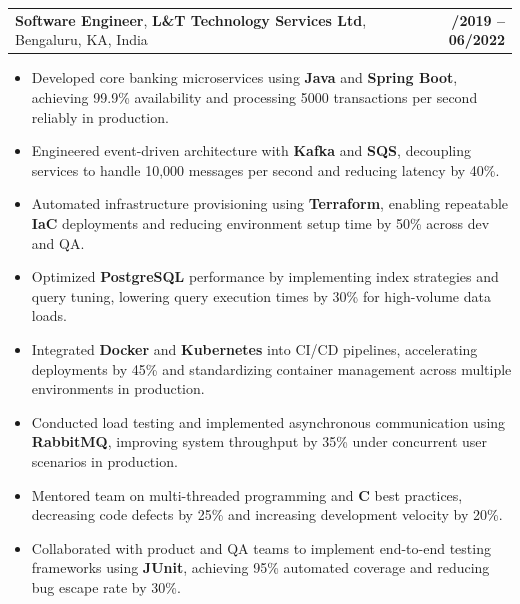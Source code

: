 \documentclass[letterpaper,11pt]{article}
\makeatletter
\newcommand{\resumeItem}[1]{
  \item\footnotesize{
    {#1 \vspace{-2pt}}
  }
}
\newcommand{\resumeSubheading}[4]{
  \vspace{-2pt}\item
    \begin{tabular*}{1.0\textwidth}[t]{l@{\extracolsep{\fill}}r}
      \textbf{\fontsize{10pt}{14pt}\selectfont #3}, \textbf{\fontsize{10pt}{14pt}\selectfont #1}, \fontsize{10pt}{14pt}\selectfont #4 & \textbf{\fontsize{10pt}{14pt}\selectfont #2} \\
    \end{tabular*}\vspace{-7pt}
}
\newcommand{\resumeItemListStart}{\begin{itemize}[leftmargin=*]}
\newcommand{\resumeItemListEnd}{\end{itemize}\vspace{-5pt}}
\makeatother
\begin{document}
    \resumeSubheading
        {L\&T Technology Services Ltd}{08/2019 -- 06/2022}
        {Software Engineer}{Bengaluru, KA, India}
      \resumeItemListStart
        \resumeItem{Developed core banking microservices using \textbf{Java} and \textbf{Spring Boot}, achieving 99.9\% availability and processing 5000 transactions per second reliably in production.}
        \resumeItem{Engineered event-driven architecture with \textbf{Kafka} and \textbf{SQS}, decoupling services to handle 10,000 messages per second and reducing latency by 40\%.}
        \resumeItem{Automated infrastructure provisioning using \textbf{Terraform}, enabling repeatable \textbf{IaC} deployments and reducing environment setup time by 50\% across dev and QA.}
        \resumeItem{Optimized \textbf{PostgreSQL} performance by implementing index strategies and query tuning, lowering query execution times by 30\% for high-volume data loads.}
        \resumeItem{Integrated \textbf{Docker} and \textbf{Kubernetes} into CI/CD pipelines, accelerating deployments by 45\% and standardizing container management across multiple environments in production.}
        \resumeItem{Conducted load testing and implemented asynchronous communication using \textbf{RabbitMQ}, improving system throughput by 35\% under concurrent user scenarios in production.}
        \resumeItem{Mentored team on multi-threaded programming and \textbf{C\+\+} best practices, decreasing code defects by 25\% and increasing development velocity by 20\%.}
        \resumeItem{Collaborated with product and QA teams to implement end-to-end testing frameworks using \textbf{JUnit}, achieving 95\% automated coverage and reducing bug escape rate by 30\%.}
      \resumeItemListEnd
\end{document}
